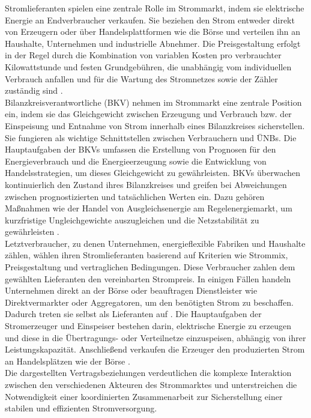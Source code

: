 Stromlieferanten spielen eine zentrale Rolle im Strommarkt, indem sie elektrische Energie an Endverbraucher verkaufen. Sie beziehen den Strom entweder direkt von Erzeugern oder über Handelsplattformen wie die Börse und verteilen ihn an Haushalte, Unternehmen und industrielle Abnehmer. Die Preisgestaltung erfolgt in der Regel durch die Kombination von variablen Kosten pro verbrauchter Kilowattstunde und festen Grundgebühren, die unabhängig vom individuellen Verbrauch anfallen und für die Wartung des Stromnetzes sowie der Zähler zuständig sind \cite{VDI5207Blatt2020}.\\

Bilanzkreisverantwortliche (BKV) nehmen im Strommarkt eine zentrale Position ein, indem sie das Gleichgewicht zwischen Erzeugung und Verbrauch bzw. der Einspeisung und Entnahme von Strom innerhalb eines Bilanzkreises sicherstellen. Sie fungieren als wichtige Schnittstellen zwischen Verbrauchern und ÜNBs. Die Hauptaufgaben der BKVs umfassen die Erstellung von Prognosen für den Energieverbrauch und die Energieerzeugung sowie die Entwicklung von Handelsstrategien, um dieses Gleichgewicht zu gewährleisten. BKVs überwachen kontinuierlich den Zustand ihres Bilanzkreises und greifen bei Abweichungen zwischen prognostizierten und tatsächlichen Werten ein. Dazu gehören Maßnahmen wie der Handel von Ausgleichsenergie am Regelenergiemarkt, um kurzfristige Ungleichgewichte auszugleichen und die Netzstabilität zu gewährleisten \cite{VDI5207Blatt2020, wawerElektrizitaetswirtschaftPraxisorientierteEinfuehrung2022}.\\ 

Letztverbraucher, zu denen Unternehmen, energieflexible Fabriken und Haushalte zählen, wählen ihren Stromlieferanten basierend auf Kriterien wie Strommix, Preisgestaltung und vertraglichen Bedingungen. Diese Verbraucher zahlen dem gewählten Lieferanten den vereinbarten Strompreis. In einigen Fällen handeln Unternehmen direkt an der Börse oder beauftragen Dienstleister wie Direktvermarkter oder Aggregatoren, um den benötigten Strom zu beschaffen. Dadurch treten sie selbst als Lieferanten auf \cite{VDI5207Blatt2020}. Die Hauptaufgaben der Stromerzeuger und Einspeiser bestehen darin, elektrische Energie zu erzeugen und diese in die Übertragungs- oder Verteilnetze einzuspeisen, abhängig von ihrer Leistungskapazität. Anschließend verkaufen die Erzeuger den produzierten Strom an Handelsplätzen wie der Börse \cite{bardtWettbewerblicherStrommarktFuer2014}.\\

Die dargestellten Vertragsbeziehungen verdeutlichen die komplexe Interaktion zwischen den verschiedenen Akteuren des Strommarktes und unterstreichen die Notwendigkeit einer koordinierten Zusammenarbeit zur Sicherstellung einer stabilen und effizienten Stromversorgung.\\

